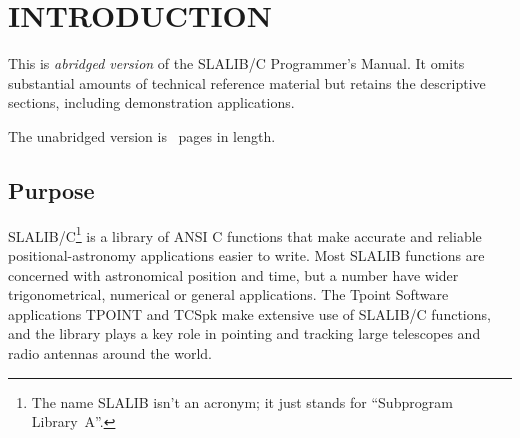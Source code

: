 \documentclass[11pt,fleqn,twoside]{article}
\renewcommand{\_}{{\tt\char'137}}     %
\begin{document}
\newenvironment{tabs}{\goodbreak\begin{tabbing}}{\end{tabbing}}
\newenvironment{cmnds}{\begin{tabs}
XXX \= XX \= XXXXXXXXXXXXXXXXXXXX \= \kill}{\end{tabs}}
\newenvironment{cmd}{\begin{tabbing}
XXXXXX \= XX \= XXXXXXXXXXXX \= \kill}{\end{tabbing}}
 
\cleardoublepage
\section{INTRODUCTION}
 
\ifx\vdoc\vshort
This is {\it abridged version}\/ of the SLALIB/C Programmer's Manual.  It
omits substantial amounts of technical reference material but retains
the descriptive sections, including demonstration applications.
 
The unabridged version is \npages\ pages in length.
\fi

\subsection{Purpose}
SLALIB/C\footnote{The name SLALIB isn't an acronym;
it just stands for ``Subprogram Library~A''.}
is a library of ANSI C functions
that make accurate and reliable positional-astronomy
applications easier to write.
Most SLALIB functions
are concerned with astronomical position and time, but a
number have wider trigonometrical, numerical or general applications.
The Tpoint Software applications TPOINT and TCSpk
make extensive use of SLALIB/C
functions, and the library plays a key role in pointing
and tracking large telescopes and radio antennas around the world.
 
\end{document}
